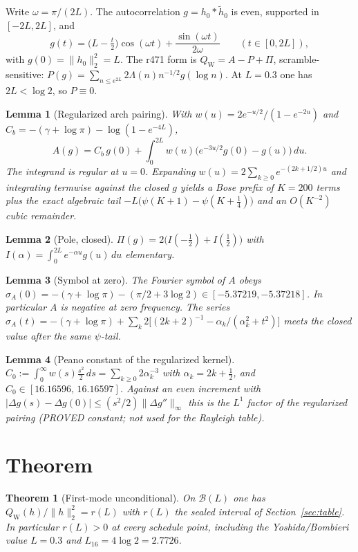 \documentclass[11pt]{article}
\newtheorem{lemma}{Lemma}
\newtheorem{theorem}{Theorem}
\theoremstyle{remark}
\newcommand{\QW}{Q_{\mathrm W}}
\begin{document}
Write $\omega=\pi/(2L)$.  The autocorrelation $g=h_0*\widetilde h_0$
is even, supported in $[-2L,2L]$, and
\[
 g(t)=\bigl(L-\tfrac t2\bigr)\cos(\omega t)+\frac{\sin(\omega t)}{2\omega}
 \qquad(t\in[0,2L]),
\]
with $g(0)=\|h_0\|_2^2=L$.  The r471 form is
$\QW=A-P+\Pi$, scramble-sensitive:
$P(g)=\sum_{n\le e^{2L}}2\Lambda(n)n^{-1/2}g(\log n)$.
At $L=0.3$ one has $2L<\log2$, so $P\equiv0$.

\begin{lemma}[Regularized arch pairing]\label{lem:A}
With $w(u)=2e^{-u/2}/(1-e^{-2u})$ and
$C_b=-(\gamma+\log\pi)-\log(1-e^{-4L})$,
\[
 A(g)=C_b\,g(0)+\int_0^{2L}w(u)\bigl(e^{-3u/2}g(0)-g(u)\bigr)\,du.
\]
The integrand is regular at $u=0$.  Expanding
$w(u)=2\sum_{k\ge0}e^{-(2k+1/2)u}$ and integrating termwise against
the closed $g$ yields a Bose prefix of $K=200$ terms plus the exact
algebraic tail $-L\bigl(\psi(K+1)-\psi(K+\tfrac14)\bigr)$ and an
$O(K^{-2})$ cubic remainder.
\end{lemma}

\begin{lemma}[Pole, closed]\label{lem:Pi}
$\Pi(g)=2\bigl(I(-\tfrac12)+I(\tfrac12)\bigr)$ with
$I(\alpha)=\int_0^{2L}e^{-\alpha u}g(u)\,du$ elementary.
\end{lemma}

\begin{lemma}[Symbol at zero]\label{lem:sig}
The Fourier symbol of $A$ obeys
$\sigma_A(0)=-(\gamma+\log\pi)-(\pi/2+3\log2)\in[-5.37219,-5.37218]$.
In particular $A$ is negative at zero frequency.  The series
$\sigma_A(t)=-(\gamma+\log\pi)+\sum_k 2\bigl[(2k+2)^{-1}
-\alpha_k/(\alpha_k^2+t^2)\bigr]$
meets the closed value after the same $\psi$-tail.
\end{lemma}

\begin{lemma}[Peano constant of the regularized kernel]\label{lem:Peano}
$\displaystyle C_0:=\int_0^\infty w(s)\frac{s^2}{2}\,ds
=\sum_{k\ge0}2\alpha_k^{-3}$
with $\alpha_k=2k+\tfrac12$, and
$C_0\in[16.16596,\,16.16597]$.
Against an even increment with
$|\Delta g(s)-\Delta g(0)|\le(s^2/2)\|\Delta g''\|_\infty$
this is the $L^1$ factor of the regularized pairing (PROVED
constant; not used for the Rayleigh table).
\end{lemma}

\section{Theorem}

\begin{theorem}[First-mode unconditional]\label{thm:main}
On $\mathcal B(L)$ one has
$\QW(h)/\|h\|_2^2=r(L)$ with $r(L)$ the sealed interval of
Section~\ref{sec:table}.  In particular $r(L)>0$ at every
schedule point, including the Yoshida/Bombieri value $L=0.3$
and $L_{16}=4\log2=2.7726$.
\end{theorem}
\end{document}
